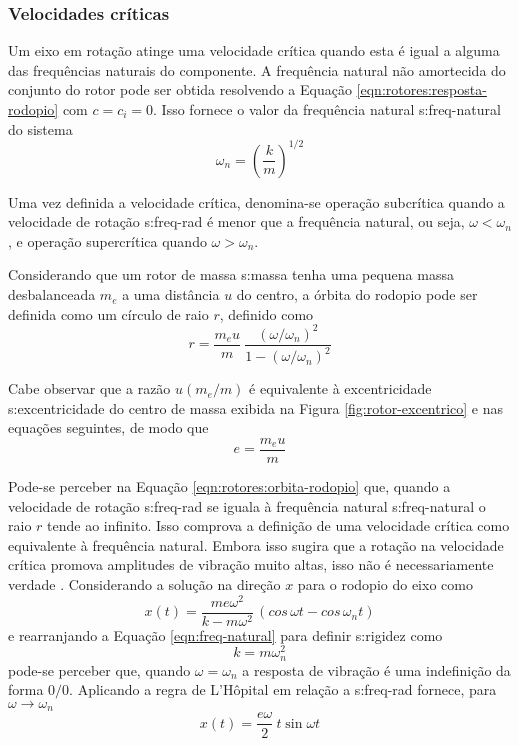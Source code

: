 \documentclass[12pt,openright,oneside,a4paper,
	chapter=TITLE,section=TITLE,
	english,brazil]{abntex2}
\begin{document}
	\subsubsection{Velocidades críticas}
	Um eixo em rotação atinge uma velocidade crítica quando esta é igual a alguma das frequências naturais do componente. A frequência natural não amortecida do conjunto do rotor pode ser obtida \cite{rao:2008} resolvendo a Equação \ref{eqn:rotores:resposta-rodopio} com $ c = c_i = 0 $. Isso fornece o valor da frequência natural \gls{s:freq-natural} do sistema
	\begin{equation} \label{eqn:freq-natural}
		\omega_n = \left( \frac{k}{m} \right)^{1/2}
	\end{equation}
	
	Uma vez definida a velocidade crítica, denomina-se \cite{dimarogonas:1995} operação subcrítica quando a velocidade de rotação \gls{s:freq-rad} é menor que a frequência natural, ou seja, $ \omega < \omega_n $, e operação supercrítica quando $ \omega > \omega_n $.
	
	Considerando que um rotor de massa \gls{s:massa} tenha uma pequena massa desbalanceada $ m_e $ a uma distância $ u $ do centro, a órbita do rodopio pode ser definida como um círculo de raio $ r $, definido como \cite{dimarogonas:1995}
	\begin{equation} \label{eqn:rotores:orbita-rodopio}
		r = \frac{m_e u}{m}\ \frac{(\omega/\omega_n)^2}{1 - (\omega/\omega_n)^2}
	\end{equation}
	
	Cabe observar que a razão $ u(m_e/m) $ é equivalente à excentricidade \gls{s:excentricidade} do centro de massa exibida na Figura \ref{fig:rotor-excentrico} e nas equações seguintes, de modo que
	\begin{equation}
		\mathit{e} = \frac{m_e u}{m}
	\end{equation}
	
	Pode-se perceber na Equação \ref{eqn:rotores:orbita-rodopio} que, quando a velocidade de rotação \gls{s:freq-rad} se iguala à frequência natural \gls{s:freq-natural} o raio $ r $ tende ao infinito. Isso comprova a definição de uma velocidade crítica como equivalente à frequência natural. Embora isso sugira que a rotação na velocidade crítica promova amplitudes de vibração muito altas, isso não é necessariamente verdade \cite{dimarogonas:1995}. Considerando a solução na direção $ x $ para o rodopio do eixo como \cite{dimarogonas:1995}
	\begin{equation}
		x(t) = \frac{m\mathit{e}\omega^2}{k-m\omega^2}\,(cos\,\omega t - cos\,\omega_n t)
	\end{equation}
	e rearranjando a Equação \ref{eqn:freq-natural} para definir \gls{s:rigidez} como \[ k = m\omega_n^2 \] pode-se perceber que, quando $ \omega = \omega_n $ a resposta de vibração é uma indefinição da forma $ 0/0 $. Aplicando a regra de L'Hôpital em relação a \gls{s:freq-rad} fornece, para $ \omega\to\omega_n $
	\begin{equation}
		x(t) = \frac{\mathit{e}\omega}{2}\ t\sin\omega t
	\end{equation}
	
\end{document}
